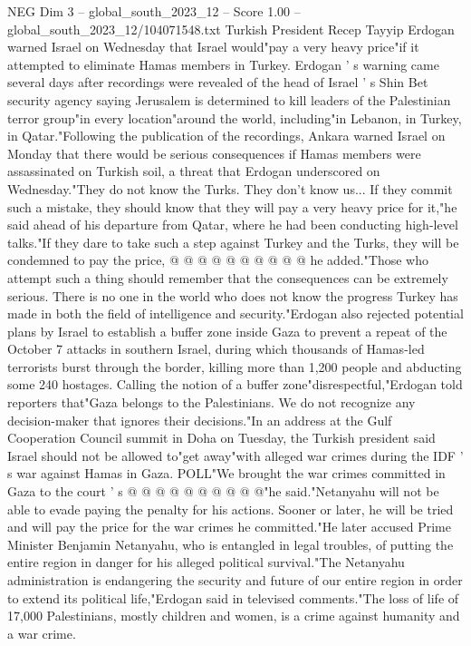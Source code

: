 \begin{textsample}{NEG Dim 3 – global\_south\_2023\_12 – Score 1.00 – global\_south\_2023\_12/104071548.txt}  \label{ex:f3_neg_007}
Turkish President Recep Tayyip Erdogan warned Israel on Wednesday that Israel would"pay a very heavy price"if it attempted to eliminate Hamas members in Turkey.
Erdogan ' s warning came several days after recordings were revealed of the head of Israel ' s Shin Bet security agency saying Jerusalem is determined to kill leaders of the Palestinian terror group"in every location"around the world, including"in Lebanon, in Turkey, in Qatar."Following the publication of the recordings, Ankara warned Israel on Monday that there would be serious consequences if Hamas members were assassinated on Turkish soil, a threat that Erdogan underscored on Wednesday."They do not know the Turks.
They don't know us...
If they commit such a mistake, they should know that they will pay a very heavy price for it,"he said ahead of his departure from Qatar, where he had been conducting high-level talks."If they dare to take such a step against Turkey and the Turks, they will be condemned to pay the price, @ @ @ @ @ @ @ @ @ @ he added."Those who attempt such a thing should remember that the consequences can be extremely serious.
There is no one in the world who does not know the progress Turkey has made in both the field of intelligence and security."Erdogan also rejected potential plans by Israel to establish a buffer zone inside Gaza to prevent a repeat of the October 7 attacks in southern Israel, during which thousands of Hamas-led terrorists burst through the border, killing more than 1,200 people and abducting some 240 hostages.
Calling the notion of a buffer zone"disrespectful,"Erdogan told reporters that"Gaza belongs to the Palestinians.
We do not recognize any decision-maker that ignores their decisions."In an address at the Gulf Cooperation Council summit in Doha on Tuesday, the Turkish president said Israel should not be allowed to"get away"with alleged war crimes during the IDF ' s war against Hamas in Gaza.
POLL"We brought the war crimes committed in Gaza to the court ' s @ @ @ @ @ @ @ @ @ @"he said."Netanyahu will not be able to evade paying the penalty for his actions.
Sooner or later, he will be tried and will pay the price for the war crimes he committed."He later accused Prime Minister Benjamin Netanyahu, who is entangled in legal troubles, of putting the entire region in danger for his alleged political survival."The Netanyahu administration is endangering the security and future of our entire region in order to extend its political life,"Erdogan said in televised comments."The loss of life of 17,000 Palestinians, mostly children and women, is a crime against humanity and a war crime.

\end{textsample}
